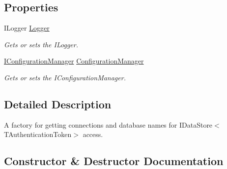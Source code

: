 \subsection*{Properties}
\begin{DoxyCompactItemize}
\item 
I\+Logger \hyperlink{classCqrs_1_1Azure_1_1DocumentDb_1_1Factories_1_1AzureDocumentDbDataStoreConnectionStringFactory_aa195f69522b48a21dc36db3ce64260e2_aa195f69522b48a21dc36db3ce64260e2}{Logger}
\begin{DoxyCompactList}\small\item\em Gets or sets the I\+Logger. \end{DoxyCompactList}\item 
\hyperlink{interfaceCqrs_1_1Configuration_1_1IConfigurationManager}{I\+Configuration\+Manager} \hyperlink{classCqrs_1_1Azure_1_1DocumentDb_1_1Factories_1_1AzureDocumentDbDataStoreConnectionStringFactory_a7d0a40bb03e9e15306023bf97094cf60_a7d0a40bb03e9e15306023bf97094cf60}{Configuration\+Manager}
\begin{DoxyCompactList}\small\item\em Gets or sets the I\+Configuration\+Manager. \end{DoxyCompactList}\end{DoxyCompactItemize}


\subsection{Detailed Description}
A factory for getting connections and database names for I\+Data\+Store$<$\+T\+Authentication\+Token$>$ access. 



\subsection{Constructor \& Destructor Documentation}
\mbox{\label{classCqrs_1_1Azure_1_1DocumentDb_1_1Factories_1_1AzureDocumentDbDataStoreConnectionStringFactory_a9b08d89df792a20e71f5278dbf39b804_a9b08d89df792a20e71f5278dbf39b804}} 
